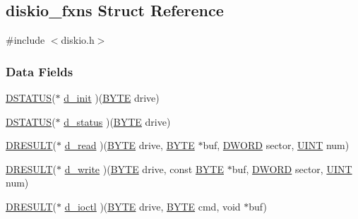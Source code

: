 \subsection{diskio\+\_\+fxns Struct Reference}
\label{structdiskio__fxns}


{\ttfamily \#include $<$diskio.\+h$>$}

\subsubsection*{Data Fields}
\begin{DoxyCompactItemize}
\item 
\hyperlink{diskio_8h_adba6790898ce4029c20a34b898ce73c1}{D\+S\+T\+A\+T\+U\+S}($\ast$ \hyperlink{structdiskio__fxns_ad6ff6dff8b8919b44120758491e06d51}{d\+\_\+init} )(\hyperlink{integer_8h_a4ae1dab0fb4b072a66584546209e7d58}{B\+Y\+T\+E} drive)
\item 
\hyperlink{diskio_8h_adba6790898ce4029c20a34b898ce73c1}{D\+S\+T\+A\+T\+U\+S}($\ast$ \hyperlink{structdiskio__fxns_a18b3f84113bc435d18db04fe745b5dfe}{d\+\_\+status} )(\hyperlink{integer_8h_a4ae1dab0fb4b072a66584546209e7d58}{B\+Y\+T\+E} drive)
\item 
\hyperlink{diskio_8h_aacdfef1dad6565f65c26d12fe0ea4b2b}{D\+R\+E\+S\+U\+L\+T}($\ast$ \hyperlink{structdiskio__fxns_ad8185cf99f04b5af57615f345194f942}{d\+\_\+read} )(\hyperlink{integer_8h_a4ae1dab0fb4b072a66584546209e7d58}{B\+Y\+T\+E} drive, \hyperlink{integer_8h_a4ae1dab0fb4b072a66584546209e7d58}{B\+Y\+T\+E} $\ast$buf, \hyperlink{integer_8h_ad342ac907eb044443153a22f964bf0af}{D\+W\+O\+R\+D} sector, \hyperlink{integer_8h_a36cb3b01d81ffd844bbbfb54003e06ec}{U\+I\+N\+T} num)
\item 
\hyperlink{diskio_8h_aacdfef1dad6565f65c26d12fe0ea4b2b}{D\+R\+E\+S\+U\+L\+T}($\ast$ \hyperlink{structdiskio__fxns_a434906fb1e70c375c203877cd696ffdf}{d\+\_\+write} )(\hyperlink{integer_8h_a4ae1dab0fb4b072a66584546209e7d58}{B\+Y\+T\+E} drive, const \hyperlink{integer_8h_a4ae1dab0fb4b072a66584546209e7d58}{B\+Y\+T\+E} $\ast$buf, \hyperlink{integer_8h_ad342ac907eb044443153a22f964bf0af}{D\+W\+O\+R\+D} sector, \hyperlink{integer_8h_a36cb3b01d81ffd844bbbfb54003e06ec}{U\+I\+N\+T} num)
\item 
\hyperlink{diskio_8h_aacdfef1dad6565f65c26d12fe0ea4b2b}{D\+R\+E\+S\+U\+L\+T}($\ast$ \hyperlink{structdiskio__fxns_a9a1890d985a25c6e14efc8d74a85a498}{d\+\_\+ioctl} )(\hyperlink{integer_8h_a4ae1dab0fb4b072a66584546209e7d58}{B\+Y\+T\+E} drive, \hyperlink{integer_8h_a4ae1dab0fb4b072a66584546209e7d58}{B\+Y\+T\+E} cmd, void $\ast$buf)
\end{DoxyCompactItemize}



